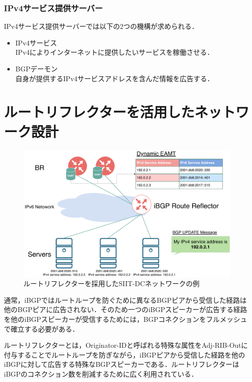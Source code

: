 \subsubsection{IPv4サービス提供サーバー}
IPv4サービス提供サーバーでは以下の2つの機構が求められる．
\begin{itemize}
    \item IPv4サービス\\
    IPv4によりインターネットに提供したいサービスを稼働させる．
    \item BGPデーモン\\
    自身が提供するIPv4サービスアドレスを含んだ情報を広告する．
\end{itemize}


\section{ルートリフレクターを活用したネットワーク設計}
\label{proposal:network_rr}
\begin{figure}[h]
    \begin{center}
    \includegraphics[width=15cm,pagebox=cropbox,clip]{img/proposal_method_network_rr.pdf}
    \end{center}
    \caption{ルートリフレクターを採用したSIIT-DCネットワークの例}
    \label{fig:proposal_method_network_rr}
\end{figure}

通常，iBGPではルートループを防ぐために異なるBGPピアから受信した経路は他のBGPピアに広告されない．そのため一つのiBGPスピーカーが広告する経路を他のiBGPスピーカーが受信するためには，BGPコネクションをフルメッシュで確立する必要がある\cite{vutukuru2005construct}．

ルートリフレクターとは，Originator-IDと呼ばれる特殊な属性をAdj-RIB-Outに付与することでルートループを防ぎながら，iBGPピアから受信した経路を他のiBGPに対して広告する特殊なBGPスピーカーである\cite{RFC4456}．ルートリフレクターはiBGPのコネクション数を削減するために広く利用されている．


